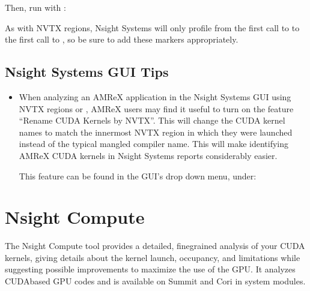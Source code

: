 \documentclass[letterpaper,10pt,english]{sphinxmanual}
\begin{document}
\sphinxAtStartPar
Then, run with :

\begin{sphinxVerbatim}[commandchars=\\\{\}]
\end{sphinxVerbatim}

\sphinxAtStartPar
As with NVTX regions, Nsight Systems will only profile from the first call to 
to the first call to , so be sure to add these markers appropriately.


\subsection{Nsight Systems GUI Tips}
\label{\detokenize{External_Profiling_Tools:nsight-systems-gui-tips}}\begin{itemize}
\item {} 
\sphinxAtStartPar
When analyzing an AMReX application in the Nsight Systems GUI using NVTX regions or ,
AMReX users may find it useful to turn on the feature “Rename CUDA Kernels by NVTX”. This will change the
CUDA kernel names to match the inner\sphinxhyphen{}most NVTX region in which they were launched instead of the typical
mangled compiler name. This will make identifying AMReX CUDA kernels in Nsight Systems reports considerably easier.

\sphinxAtStartPar
This feature can be found in the GUI’s drop down menu, under:

\end{itemize}

\begin{sphinxVerbatim}[commandchars=\\\{\}]
\end{sphinxVerbatim}


\section{Nsight Compute}
\label{\detokenize{External_Profiling_Tools:nsight-compute}}
\sphinxAtStartPar
The Nsight Compute tool provides a detailed, fine\sphinxhyphen{}grained analysis of your CUDA kernels,
giving details about the kernel launch, occupancy, and limitations while suggesting possible
improvements to maximize the use of the GPU.  It analyzes CUDA\sphinxhyphen{}based GPU codes and is available
on Summit and Cori in system modules.
\end{document}
